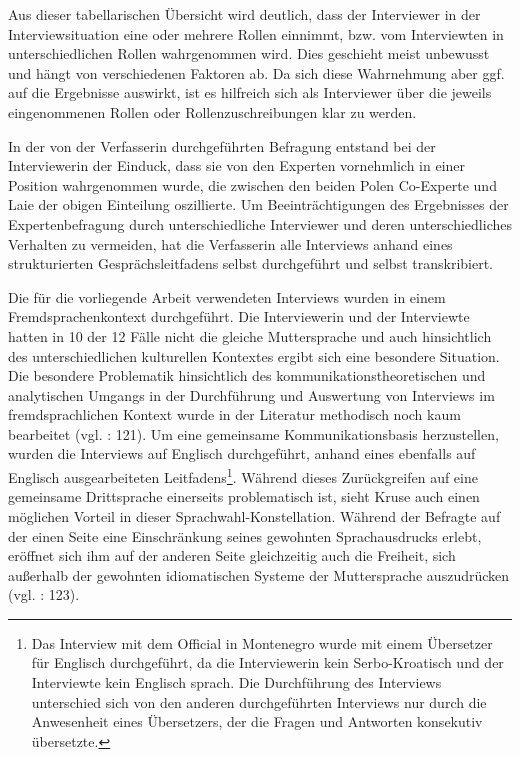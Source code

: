 Aus dieser tabellarischen Übersicht wird deutlich, dass der Interviewer in der Interviewsituation eine oder mehrere Rollen einnimmt, bzw. vom Interviewten in unterschiedlichen Rollen wahrgenommen wird. Dies geschieht meist unbewusst und hängt von verschiedenen Faktoren ab. Da sich diese Wahrnehmung aber ggf. auf die Ergebnisse auswirkt, ist es hilfreich sich als Interviewer über die jeweils eingenommenen Rollen oder Rollenzuschreibungen klar zu werden. \par
In der von der Verfasserin durchgeführten Befragung entstand bei der Interviewerin der Einduck, dass sie von den Experten vornehmlich in einer Position wahrgenommen wurde, die zwischen den beiden Polen Co-Experte und Laie der obigen Einteilung oszillierte. Um Beeinträchtigungen des Ergebnisses der Expertenbefragung durch unterschiedliche Interviewer und deren unterschiedliches Verhalten zu vermeiden, hat die Verfasserin alle Interviews anhand eines strukturierten Gesprächsleitfadens selbst durchgeführt und selbst transkribiert.\par
Die für die vorliegende Arbeit verwendeten Interviews wurden in einem Fremdsprachenkontext durchgeführt. Die Interviewerin und der Interviewte hatten in 10 der 12 Fälle nicht die gleiche Muttersprache und auch hinsichtlich des unterschiedlichen kulturellen Kontextes ergibt sich eine besondere Situation. Die besondere Problematik hinsichtlich des kommunikationstheoretischen und analytischen Umgangs in der Durchführung und Auswertung von Interviews im fremdsprachlichen Kontext wurde in der Literatur methodisch noch kaum bearbeitet (vgl. \cite{kruse} : 121). Um eine gemeinsame Kommunikationsbasis herzustellen, wurden die Interviews auf Englisch durchgeführt, anhand eines ebenfalls auf Englisch ausgearbeiteten Leitfadens\footnote{Das Interview mit dem Official in Montenegro wurde mit einem Übersetzer für Englisch durchgeführt, da die Interviewerin kein Serbo-Kroatisch und der Interviewte kein Englisch sprach. Die Durchführung des Interviews unterschied sich von den anderen durchgeführten Interviews nur durch die Anwesenheit eines Übersetzers, der die Fragen und Antworten konsekutiv übersetzte.}. Während dieses Zurückgreifen auf eine gemeinsame Drittsprache einerseits problematisch ist, sieht Kruse auch einen möglichen Vorteil in dieser Sprachwahl-Konstellation. Während der Befragte auf der einen Seite eine Einschränkung seines gewohnten Sprachausdrucks erlebt, eröffnet sich ihm auf der anderen Seite gleichzeitig auch die Freiheit, sich außerhalb der gewohnten idiomatischen Systeme der Muttersprache auszudrücken (vgl. \cite{kruse} : 123). \par
